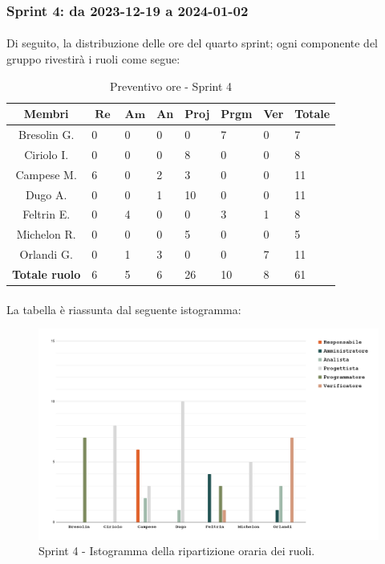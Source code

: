 \documentclass[10pt, a4paper]{article}
\begin{document}
{{{{{{{{{{{%

\subsubsection{Sprint 4: da 2023-12-19 a 2024-01-02}
\paragraph{}Di seguito, la distribuzione delle ore del quarto sprint; ogni componente del gruppo rivestirà i ruoli come segue:
\begin{table}[H]
\begin{tabularx}{\textwidth}{c|X|X|X|X|X|X|X}
        \textbf{Membri} & $\operatorname{\textbf{Re}}$ & $\mathrm{\textbf{Am}}$ & \textbf{An} & \textbf{Proj} & \textbf{Prgm} & \textbf{Ver} & \textbf{Totale} \\
        \hline Bresolin G. & 0 & 0 & 0 & 0 & \cellcolor{primarycolor}7 & 0 & 7 \\
        \hline Ciriolo I.  & 0 & 0 & 0 & \cellcolor{primarycolor}8 & 0 & 0 & 8 \\
        \hline Campese M.  & \cellcolor{primarycolor}6 & 0 & 2 & 3 & 0 & 0 & 11 \\
        \hline Dugo A.     & 0 & 0 & 1 & \cellcolor{primarycolor}10 & 0 & 0 & 11 \\
        \hline Feltrin E.  & 0 & \cellcolor{primarycolor}4 & 0 & 0 & 3 & 1 & 8 \\
        \hline Michelon R. & 0 & 0 & 0 & \cellcolor{primarycolor}5 & 0 & 0 & 5 \\
        \hline Orlandi G.  & 0 & 1 & 3 & 0 & 0 & \cellcolor{primarycolor}7 & 11 \\
        \hline
        \textbf{Totale ruolo} & 6 & 5 & 6 & 26 & 10 & 8 & 61 
    \end{tabularx}
    \caption{Preventivo ore - Sprint 4}
    \end{table}

\paragraph{}La tabella è riassunta dal seguente istogramma:
 \begin{figure}[H]
        \centering        
        \includegraphics[width=15.5cm]{istogrammi/istogramma_4_periodo.png}
        \caption{Sprint 4 - Istogramma della ripartizione oraria dei ruoli. }
    \end{figure}

}}}}}}}}}}}
\end{document}
